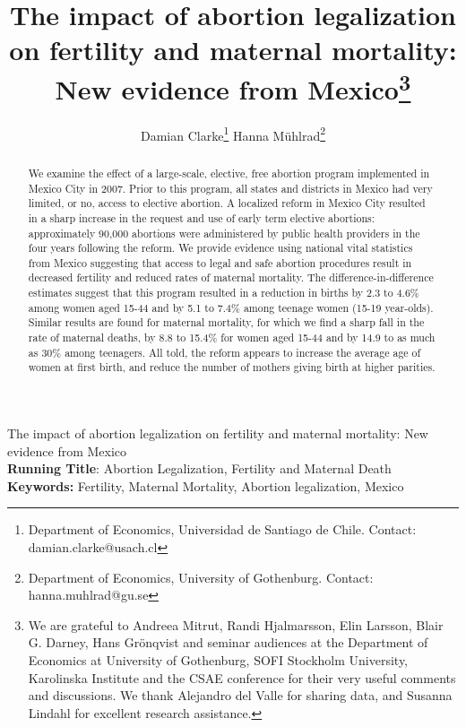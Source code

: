 \documentclass[a4paper, 11pt]{article}
\title{The impact of abortion legalization on fertility and maternal mortality: New evidence from Mexico\thanks{We are grateful to Andreea Mitrut, Randi Hjalmarsson, Elin Larsson, Blair G. Darney, Hans Gr\"onqvist and seminar audiences at the Department of Economics at University of Gothenburg,  SOFI Stockholm University, Karolinska Institute and the CSAE conference for their very useful comments and discussions.  We thank Alejandro del Valle for sharing data, and Susanna Lindahl for excellent research assistance.}}
\author{Damian Clarke\thanks{Department of Economics, Universidad de Santiago de Chile.  Contact: damian.clarke@usach.cl} \hspace{1cm} Hanna Mühlrad\thanks{Department of Economics, University of Gothenburg. Contact: hanna.muhlrad@gu.se}}
\begin{document}
\maketitle
\newpage
{}

\begin{spacing}{2}
\begin{center}
  {\Large The impact of abortion legalization on fertility and maternal mortality: New evidence from Mexico}
  \\
\vspace{5mm}
  \textbf{Running Title}: Abortion Legalization, Fertility and Maternal Death \\
\textbf{Keywords:} Fertility, Maternal Mortality, Abortion legalization, Mexico

\end{center}

\newpage

\begin{abstract}
\noindent We examine the effect of a large-scale, elective, free abortion program implemented in Mexico City in 2007. Prior to this program, all states and districts in Mexico had very limited, or no, access to elective abortion. A localized reform in Mexico City resulted in a sharp increase in the request and use of early term elective abortions: approximately 90,000 abortions were administered by public health providers in the four years following the reform. We provide evidence using national vital statistics from Mexico suggesting that access to legal and safe abortion procedures result in decreased fertility and reduced rates of maternal mortality. The difference-in-difference estimates suggest that this program resulted in a reduction in births by 2.3 to 4.6\% among women aged 15-44 and by 5.1 to 7.4\% among teenage women (15-19 year-olds). Similar results are found for maternal mortality, for which we find a sharp fall in the rate of maternal deaths, by 8.8 to 15.4\% for women aged 15-44 and by 14.9 to as much as 30\% among teenagers.  All told, the reform appears to increase the average age of women at first birth, and reduce the number of mothers giving birth at higher parities.
\end{abstract}



\newpage 

\end{spacing}
\end{document}

